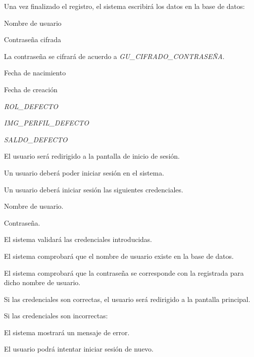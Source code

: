 \begin{RFGestionUsuarios}
\begin{RFGestionUsuarios}
\begin{RFGestionUsuarios}
			\end{RFGestionUsuarios}
		\item Una vez finalizado el registro, el sistema escribirá los datos en la base de datos:
			\begin{RFGestionUsuarios}
				\item Nombre de usuario
				\item Contraseña cifrada
				\begin {RFGestionUsuarios}
					\item La contraseña se cifrará de acuerdo a \textit{GU\_CIFRADO\_CONTRASEÑA}.
				\end{RFGestionUsuarios}
				\item Fecha de nacimiento
				\item Fecha de creación
				\item \textit{ROL\_DEFECTO}
				\item \textit{IMG\_PERFIL\_DEFECTO}
				\item \textit{SALDO\_DEFECTO}
			\end{RFGestionUsuarios}

		\item El usuario será redirigido a la pantalla de inicio de sesión.
	\end{RFGestionUsuarios}

	\item Un usuario deberá poder iniciar sesión en el sistema.\label{req_inicio_sesion}
    \begin{RFGestionUsuarios}%
      \item Un usuario deberá iniciar sesión las siguientes credenciales.
		\begin{RFGestionUsuarios}
		  \item Nombre de usuario.
		  \item Contraseña.
		\end{RFGestionUsuarios}
	  \item El sistema validará las credenciales introducidas.
		\begin{RFGestionUsuarios}
			\item El sistema comprobará que el nombre de usuario existe en la base de datos.
			\item El sistema comprobará que la contraseña se corresponde con la registrada para dicho nombre de usuario.
		\end{RFGestionUsuarios}

      \item Si las credenciales son correctas, el usuario será redirigido a la pantalla principal.
	  \item Si las credenciales son incorrectas:
		\begin{RFGestionUsuarios}
			\item El sistema mostrará un mensaje de error.
			\item El usuario podrá intentar iniciar sesión de nuevo.
		\end{RFGestionUsuarios}
    \end{RFGestionUsuarios}

\end{RFGestionUsuarios}



  
  